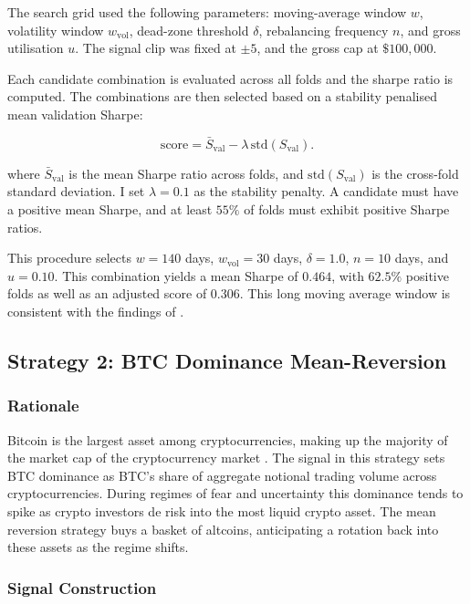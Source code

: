 \documentclass[10pt,a4paper]{article}
\begin{document}
The search grid used the following parameters: moving-average window $w$, volatility window $w_{\mathrm{vol}}$, dead-zone threshold $\delta$, rebalancing frequency $n$, and gross utilisation $u$. The signal clip was fixed at $\pm 5$, and the gross cap at $\$100{,}000$.

Each candidate combination is evaluated across all folds and the sharpe ratio is computed. The combinations are then selected based on a stability penalised mean validation Sharpe:

\begin{equation}
    \mathrm{score} = \bar{S}_{\mathrm{val}} - \lambda\,\mathrm{std}(S_{\mathrm{val}}).
\end{equation}

where $\bar{S}_{\mathrm{val}}$ is the mean Sharpe ratio across folds, and $\mathrm{std}(S_{\mathrm{val}})$ is the cross-fold standard deviation. I set $\lambda = 0.1$ as the stability penalty. A candidate must have a positive mean Sharpe, and at least $55\%$ of folds must exhibit positive Sharpe ratios.

This procedure selects $w = 140$ days, $w_{\mathrm{vol}} = 30$ days, $\delta = 1.0$, $n = 10$ days, and $u = 0.10$. This combination yields a mean Sharpe of $0.464$, with $62.5\%$ positive folds as well as an adjusted score of 0.306. This long moving average window is consistent with the findings of \citep{moskowitz2012timeseriesmomentum}.

\subsection{Strategy 2: BTC Dominance Mean-Reversion}

\subsubsection{Rationale}

Bitcoin is the largest asset among cryptocurrencies, making up the majority of the market cap of the cryptocurrency market \citep{coinmarketcap2026}. The signal in this strategy sets BTC dominance as BTC's share of aggregate notional trading volume across cryptocurrencies. During regimes of fear and uncertainty this dominance tends to spike as crypto investors de risk into the most liquid crypto asset. The mean reversion strategy buys a basket of altcoins, anticipating a rotation back into these assets as the regime shifts.

\subsubsection{Signal Construction}
\end{document}
